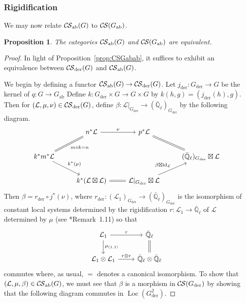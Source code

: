 \documentclass[10pt]{amsart}
\theoremstyle{plain}
\newtheorem{proposition}[theorem]{Proposition}
\theoremstyle{definition}
\newcommand{\EE}{\mathbb{\bar Q}_\ell}
\DeclareMathOperator{\id}{id}
\DeclareMathOperator{\Loc}{Loc}
\newcommand{\der}{_{\operatorname{der}}}
\newcommand{\ab}{_{\operatorname{ab}}}
\newcommand{\cs}[1]{{\mathcal{#1}}}
\newcommand{\CS}{{\mathcal{C\hskip-0.8pt S}}}
\begin{document}
\subsubsection{Rigidification} 

We may now relate $\CS\ab(G)$ to $\CS(G\ab)$.

\begin{proposition}\label{prop:nubeta}
The categories $\CS\ab(G)$ and $\CS(G\ab)$ are equivalent.
\end{proposition}

\begin{proof}
In light of Proposition~\ref{prop:CSGabab}, it suffices to exhibit an equivalence  between $\CS\der(G)$ and $\CS\ab(G)$.

We begin by defining a functor $\CS\ab(G) \to \CS\der(G)$.
Let $j\der : G\der \to G$ be the kernel of $q:G \to G\ab$ 
Define $k: G\der\times G\to G\times G$ by $k(h,g) = (j\der(h),g)$.
Then for $(\cs{L},\mu,\nu) \in \CS\der(G)$, define $\beta : \cs{L}\vert_{G\der} \to (\EE)_{G\der}$ by the following diagram.
\begin{equation}\label{eqn:betanu}
\begin{tikzcd}
& n^* \cs{L} \arrow[equal]{dl}{m\circ k = n} \arrow{r}{\nu} & p^*\cs{L} &  \\ 
k^* m^* \cs{L} \arrow{dr}{k^*(\mu)} &&& (\EE)_{G\der} \boxtimes \cs{L} \arrow[equal]{ul} \\
& k^*(\cs{L}\boxtimes\cs{L}) \arrow[equal]{r} & \cs{L}\vert_{G\der}\boxtimes \cs{L} \arrow{ur}{\beta\boxtimes \id_\cs{L}}
\end{tikzcd}
\end{equation}
Then $\beta = r\der \circ j^*(\nu)$, where $r\der : (\cs{L}_1)_{G\der} \to (\EE)_{G\der}$ is the isomorphism of constant local systems  determined by the rigidification $r: \cs{L}_1 \to \EE$ of $\cs{L}$ determined by $\mu$ (see \cite{cunningham-roe:13a}*{Remark~1.11}) so that
\begin{equation}\label{eqn:rigidification}
\begin{tikzcd}
\cs{L}_1 \arrow{r}{r} \arrow{d}{\mu_{(1,1)}}  & \EE \arrow[equal]{d} \\
\cs{L}_1\otimes\cs{L}_1 \arrow{r}{r\otimes r}  & \EE\otimes  \EE
\end{tikzcd}
\end{equation}
commutes where, as usual, $=$ denotes a canonical isomorphism.
%
To show that $(\cs{L},\mu,\beta) \in \CS\ab(G)$, we must see that $\beta$ is a morphism in $\CS(G\der)$ by showing that the following diagram commutes in $\Loc(G\der^2)$.

\end{proof}
\end{document}

